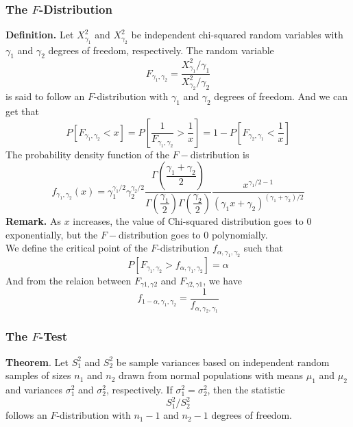 \documentclass[a4paper,12pt]{article}
\begin{document}
\subsubsection{The $F$-Distribution}
\textbf{Definition.} Let $X_{\gamma_1}^2$ and $X_{\gamma_2}^2$ be independent chi-squared random variables with $\gamma_1$ and $\gamma_2$ degrees of freedom, respectively.
The random variable
\begin{equation}
F_{\gamma_1, \gamma_2}=\frac{X_{\gamma_1}^2 / \gamma_1}{X_{\gamma_2}^2 / \gamma_2}
\end{equation}
is said to follow an $F$-distribution with $\gamma_1$ and $\gamma_2$ degrees of freedom. And we can get that
\begin{equation}
P\left[F_{\gamma_1, \gamma_2}<x\right]=P\left[\frac{1}{F_{\gamma_1, \gamma_2}}>\frac{1}{x}\right]=1-P\left[F_{\gamma_2, \gamma_1}<\frac{1}{x}\right]
\end{equation}
The probability density function of the $F-$distribution is
\begin{equation}
    f_{\gamma_1, \gamma_2}(x)=\gamma_1^{\gamma_1 / 2} \gamma_2^{\gamma_2 / 2} \dfrac{\Gamma\left(\dfrac{\gamma_1+\gamma_2}{2}\right)}{\Gamma\left(\dfrac{\gamma_1}{2}\right) \Gamma\left(\dfrac{\gamma_2}{2}\right)} \dfrac{x^{\gamma_1 / 2-1}}{\left(\gamma_1 x+\gamma_2\right)^{\left(\gamma_1+\gamma_2\right) / 2}}
    \end{equation}
\textbf{Remark.} As $x$ increases, the value of Chi-squared distribution goes to $0$ exponentially, but the $F-$distribution goes to $0$ polynomially. \\

\noindent We define the critical point of the $F$-distribution $f_{\alpha, \gamma_1, \gamma_2}$ such that
$$
 P\left[F_{\gamma_1, \gamma_2}>f_{\alpha, \gamma_1, \gamma_2}\right]=\alpha 
$$
And from the relaion between $F_{\gamma 1, \gamma 2}$ and $F_{\gamma 2, \gamma 1}$, we have
\begin{equation}
    f_{1-\alpha, \gamma_1, \gamma_2}=\frac{1}{f_{\alpha, \gamma_2, \gamma_1}}
    \end{equation}

\subsubsection{The $F$-Test}
\textbf{Theorem}. Let $S_1^2$ and $S_2^2$ be sample variances based on independent random samples of sizes $n_1$ and $n_2$ drawn from normal populations with means $\mu_1$ and $\mu_2$ and variances $\sigma_1^2$ and $\sigma_2^2$, respectively. If $\sigma_1^2=\sigma_2^2$, then the statistic
$$
S_1^2 / S_2^2
$$
follows an $F$-distribution with $n_1-1$ and $n_2-1$ degrees of freedom.\\
\end{document}
